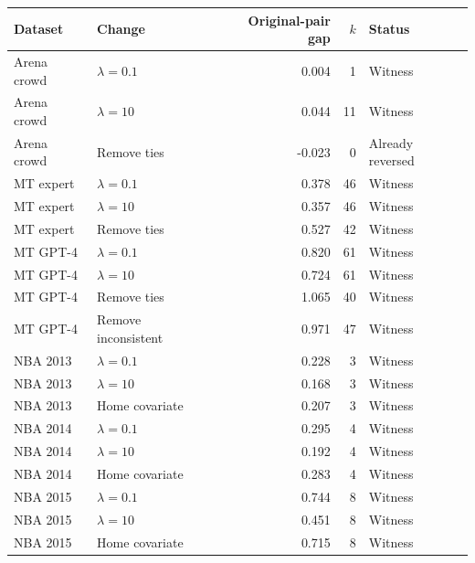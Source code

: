 \begin{tabular}{llrrl}
\toprule
Dataset & Change & Original-pair gap & $k$ & Status \\
\midrule
Arena crowd & $\lambda=0.1$ & 0.004 & 1 & Witness \\
Arena crowd & $\lambda=10$ & 0.044 & 11 & Witness \\
Arena crowd & Remove ties & -0.023 & 0 & Already reversed \\
MT expert & $\lambda=0.1$ & 0.378 & 46 & Witness \\
MT expert & $\lambda=10$ & 0.357 & 46 & Witness \\
MT expert & Remove ties & 0.527 & 42 & Witness \\
MT GPT-4 & $\lambda=0.1$ & 0.820 & 61 & Witness \\
MT GPT-4 & $\lambda=10$ & 0.724 & 61 & Witness \\
MT GPT-4 & Remove ties & 1.065 & 40 & Witness \\
MT GPT-4 & Remove inconsistent & 0.971 & 47 & Witness \\
NBA 2013 & $\lambda=0.1$ & 0.228 & 3 & Witness \\
NBA 2013 & $\lambda=10$ & 0.168 & 3 & Witness \\
NBA 2013 & Home covariate & 0.207 & 3 & Witness \\
NBA 2014 & $\lambda=0.1$ & 0.295 & 4 & Witness \\
NBA 2014 & $\lambda=10$ & 0.192 & 4 & Witness \\
NBA 2014 & Home covariate & 0.283 & 4 & Witness \\
NBA 2015 & $\lambda=0.1$ & 0.744 & 8 & Witness \\
NBA 2015 & $\lambda=10$ & 0.451 & 8 & Witness \\
NBA 2015 & Home covariate & 0.715 & 8 & Witness \\
\bottomrule
\end{tabular}
